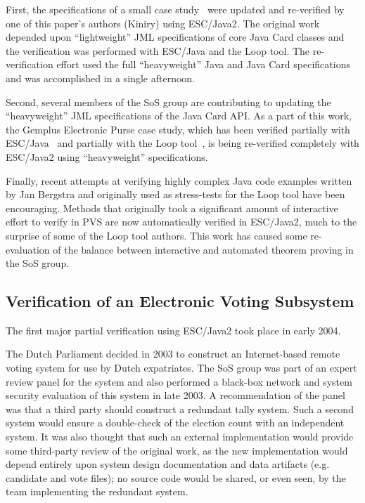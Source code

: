 \documentclass{llncs}
\begin{document}
First, the specifications of a small case
study~\cite{BreunesseJacobsBerg02} were updated and re-verified by one
of this paper's authors (Kiniry) using ESC/Java2.  The original work
depended upon ``light\-weight'' JML specifications of core Java Card
classes and the verification was performed with ESC/Java and
the Loop tool.  The re-verification effort used the full
``heavyweight'' Java and Java Card specifications and was accomplished
in a single afternoon.

Second, several members of the SoS group are contributing to updating
the ``heavyweight'' JML specifications of the Java Card API.  As a
part of this work, the Gemplus Electronic Purse case study, which has
been verified partially with ESC/Java~\cite{CatanoHuisman02} and
partially with the Loop tool~\cite{BreunesseJacobsBerg02}, is being
re-verified completely with ESC/Java2 using ``heavyweight''
specifications.

Finally, recent attempts at verifying highly complex Java code
examples written by Jan Bergstra and originally used as stress-tests
for the Loop tool have been encouraging.  Methods that originally took
a significant amount of interactive effort to verify in PVS are now
automatically verified in ESC/Java2, much to the surprise of some of
the Loop tool authors.  This work has caused some re-evaluation of the
balance between interactive and automated theorem proving in the SoS
group.

\subsection{Verification of an Electronic Voting Subsystem}

The first major partial verification using ESC/Java2 took place in
early 2004.

The Dutch Parliament decided in 2003 to construct an Internet-based
remote voting system for use by Dutch expatriates.  The SoS group was
part of an expert review panel for the system and also performed a
black-box network and system security evaluation of this system in
late 2003.  A recommendation of the panel was that a third party
should construct a redundant tally system.  Such a second system would
ensure a double-check of the election count with an independent
system.  It was also thought that such an external implementation
would provide some third-party review of the original work, as the new
implementation would depend entirely upon system design documentation
and data artifacts (e.g. candidate and vote files); no source code
would be shared, or even seen, by the team implementing the redundant
system.
\end{document}
